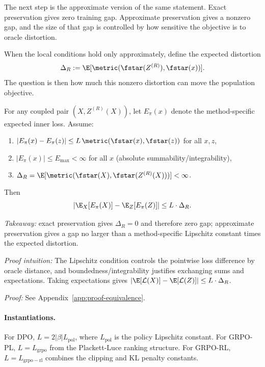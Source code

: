 The next step is the approximate version of the same statement. Exact preservation gives zero training gap. Approximate preservation gives a nonzero gap, and the size of that gap is controlled by how sensitive the objective is to oracle distortion.

When the local conditions hold only approximately, define the expected distortion
\[
\Delta_R := \E[\metric(\fstar(Z^{(R)}), \fstar(x))].
\]
The question is then how much this nonzero distortion can move the population objective.

\begin{theorem}\label{thm:unified-gap}
For any coupled pair $(X, Z^{(R)}(X))$, let $E_\pi(x)$ denote the method-specific expected inner loss. Assume:
\begin{enumerate}[nosep]
\item $|E_\pi(x)-E_\pi(z)| \le L\,\metric(\fstar(x),\fstar(z))$ for all $x,z$,
\item $|E_\pi(x)| \le E_{\max} < \infty$ for all $x$ (absolute summability/integrability),
\item $\Delta_R = \E[\metric(\fstar(X),\fstar(Z^{(R)}(X)))] < \infty$.
\end{enumerate}
Then
\[
\left| \E_X[E_\pi(X)] - \E_Z[E_\pi(Z)] \right| \le L \cdot \Delta_R.
\]
\end{theorem}

\noindent\textit{Takeaway:} exact preservation gives $\Delta_R = 0$ and therefore zero gap; approximate preservation gives a gap no larger than a method-specific Lipschitz constant times the expected distortion.

\noindent\textit{Proof intuition:} The Lipschitz condition controls the pointwise loss difference by oracle distance, and boundedness/integrability justifies exchanging sums and expectations. Taking expectations gives $|\E[\mathcal{L}(X)] - \E[\mathcal{L}(Z)]| \le L \cdot \Delta_R$.

\noindent\textit{Proof:} See Appendix~\ref{app:proof-equivalence}.

\paragraph{Instantiations.}
For DPO, $L = 2|\beta| L_{\mathrm{pol}}$, where $L_{\mathrm{pol}}$ is the policy Lipschitz constant. For GRPO-PL, $L = L_{\mathrm{grpo}}$ from the Plackett-Luce ranking structure. For GRPO-RL, $L = L_{\mathrm{grpo-rl}}$ combines the clipping and KL penalty constants.

